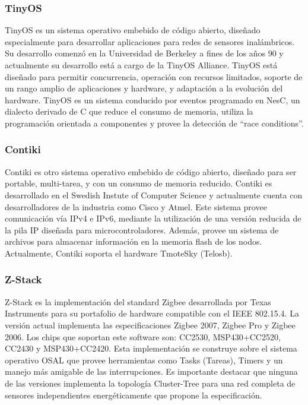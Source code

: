 \subsubsection{TinyOS}
TinyOS es un sistema operativo embebido de código abierto, diseñado especialmente para desarrollar aplicaciones para redes de sensores inalámbricos. Su desarrollo comenzó en la Universidad de Berkeley a fines de los años 90 y actualmente su desarrollo está a cargo de la TinyOS Alliance. TinyOS está diseñado para permitir concurrencia, operación con recursos limitados, soporte de un rango amplio de aplicaciones y hardware, y adaptación a la evolución del hardware. TinyOS es un sistema conducido por eventos  programado en NesC, un dialecto derivado de C que reduce el consumo de memoria, utiliza la programación orientada a componentes y provee la detección de ``race conditions''. \\

\subsubsection{Contiki}
Contiki es otro sistema operativo embebido de código abierto, diseñado para ser portable, multi-tarea, y con un consumo de memoria reducido. Contiki es desarrollado en el Swedish Instute of Computer Science y actualmente cuenta con desarrolladores de la industria como Cisco y Atmel. Este sistema provee comunicación vía IPv4 e IPv6, mediante la utilización de una versión reducida de la pila IP diseñada para microcontroladores. Además, provee un sistema de archivos para almacenar información en la memoria flash de los nodos. Actualmente, Contiki soporta el hardware TmoteSky (Telosb).

\subsubsection{Z-Stack}
Z-Stack es la implementación del standard Zigbee desarrollada por Texas Instruments para su portafolio de hardware compatible con el IEEE 802.15.4. La versión actual implementa las especificaciones Zigbee 2007, Zigbee Pro y Zigbee 2006. Los chips que soportan este software son: CC2530, MSP430+CC2520, CC2430 y MSP430+CC2420. 	Esta implementación se construye sobre el sistema operativo OSAL que provee herramientas como Tasks (Tareas), Timers y un manejo más amigable de las interrupciones. Es importante destacar que ninguna de las versiones implementa la topología Cluster-Tree para una red completa de sensores independientes energéticamente que propone la especificación.

